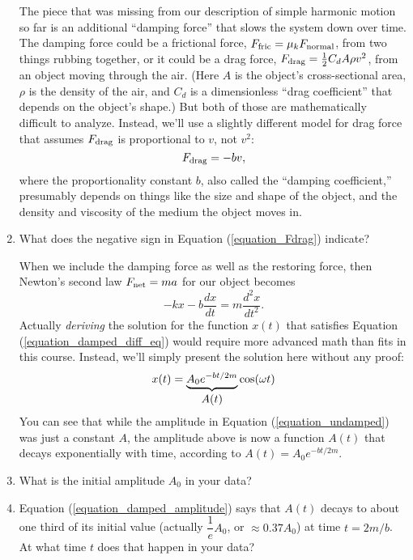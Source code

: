 \begin{enumerate}[labparts]
The piece that was missing from our description of simple harmonic motion so far is an additional ``damping force'' that slows the system down over time.  The damping force could be a frictional force, $F_{\rm fric}=\mu_k F_{\rm normal}$,  from two things rubbing together, or it could be a drag force, $F_{\rm drag} = \frac{1}{2}C_d A \rho v^2$, from an object moving through the air.  
(Here $A$ is the object's cross-sectional area, $\rho$ is the density of the air, and $C_d$ is a dimensionless ``drag coefficient'' that depends on the object's shape.)
But both of those are mathematically difficult to analyze.  Instead, we'll use a slightly different model for drag force that assumes $F_{\rm drag}$ is proportional to $v$, not $v^2$:
\begin{equation}
F_{\rm drag}=-bv,
\label{equation_Fdrag}
\end{equation}
where the proportionality constant $b$, also called the ``damping coefficient,'' presumably depends on things like the size and shape of the object, and the density and viscosity of the medium the object moves in.

\item What does the negative sign in Equation (\ref{equation_Fdrag}) indicate?
\answerspace{0.6in}

When we include the damping force as well as the restoring force, then Newton's second law $F_{\rm net} = ma$ for our object becomes
\begin{equation}
-kx-b\frac{dx}{dt}=m\frac{d^2x}{dt^2}.
\label{equation_damped_diff_eq}
\end{equation}
Actually \textit{deriving} the solution for the function $x(t)$ that satisfies Equation (\ref{equation_damped_diff_eq}) would require more advanced math than fits in this course.  Instead, we'll simply present the solution here without any proof:  
\begin{equation}
x(t)=\underbrace{A_0e^{-bt/2m}}_{%
\let\scriptstyle\textstyle 
\substack{A(t)}}
\cos(\omega t)
\label{equation_damped_amplitude}
\end{equation}
You can see that while the amplitude in Equation (\ref{equation_undamped}) was just a constant $A$, the amplitude above is now a function 
$A(t)$ that decays exponentially with time, according to $A(t) = A_0e^{-bt/2m}$.   

\item What is the initial amplitude $A_0$ in your data?
\answerspace{0.6in}

\item Equation (\ref{equation_damped_amplitude}) says that $A(t)$ decays to about one third of its initial value (actually $\dfrac{1}{e}A_0$, or $\approx 0.37A_0$) at time $t=2m/b$.  At what time $t$ does that happen in your data?
\answerspace{0.6in}


\end{enumerate}
